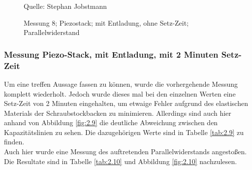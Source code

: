\documentclass[12pt]{scrreprt} %
\begin{document}
\begin {figure}[htbp]
\caption[Messung 8; ohne Setz-Zeit; Parallelwiderstand]{Messung 8; Piezostack; mit Entladung, ohne Setz-Zeit; Parallelwiderstand}
      \begin{center}
      \end{center}
Quelle: Stephan Jobstmann
\label{fig:2.8}
\end{figure}

\newpage
\subsubsection{Messung Piezo-Stack, mit Entladung, mit 2 Minuten Setz-Zeit}
Um eine treffen Aussage fassen zu können, wurde die vorhergehende Messung komplett wiederholt. Jedoch wurde dieses mal bei den einzelnen Werten eine Setz-Zeit von 2 Minuten eingehalten, um etwaige Fehler aufgrund des elastischen Materials der Schraubstockbacken zu minimieren. Allerdings sind auch hier anhand von Abbildung \vref{fig:2.9} die deutliche Abweichung zwischen den Kapazitätslinien zu sehen. Die dazugehörigen Werte sind in Tabelle \vref{tab:2.9} zu finden.\\
Auch hier wurde eine Messung des auftretenden Parallelwiderstands angestoßen. Die Resultate sind in Tabelle \vref{tab:2.10} und Abbildung \vref{fig:2.10} nachzulesen.
\end{document}
